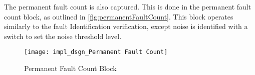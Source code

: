 \par The permanent fault count is also captured. This is done in the permanent fault count block, as outlined in \autoref{fig:permanentFaultCount}. This block operates similarly to the fault Identification verification, except noise is identified with a switch to set the noise threshold level.
 \begin{figure}[H]
    \texttt{[image: impl\_dsgn\_Permanent Fault Count]}
    \caption{Permanent Fault Count Block}
    \label{fig:permanentFaultCount}
\end{figure}